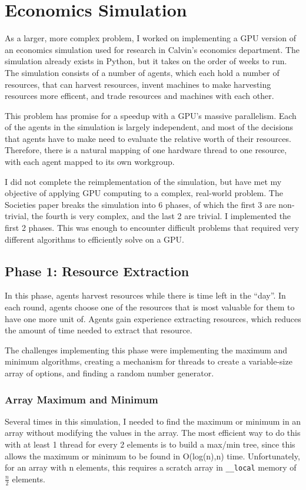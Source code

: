 \documentclass{article}
\begin{document}
\section{Economics Simulation}
As a larger, more complex problem, I worked on implementing a GPU version of an economics simulation used for research in Calvin's economics department.\cite{ditta13} The simulation already exists in Python, but it takes on the order of weeks to run. The simulation consists of a number of agents, which each hold a number of resources, that can harvest resources, invent machines to make harvesting resources more efficent, and trade resources and machines with each other.

This problem has promise for a speedup with a GPU's massive parallelism. Each of the agents in the simulation is largely independent, and most of the decisions that agents have to make need to evaluate the relative worth of their resources. Therefore, there is a natural mapping of one hardware thread to one resource, with each agent mapped to its own workgroup.

I did not complete the reimplementation of the simulation, but have met my objective of applying GPU computing to a complex, real-world problem. The Societies paper\cite{ditta13} breaks the simulation into 6 phases, of which the first 3 are non-trivial, the fourth is very complex, and the last 2 are trivial. I implemented the first 2 phases. This was enough to encounter difficult problems that required very different algorithms to efficiently solve on a GPU.

\subsection{Phase 1: Resource Extraction}
In this phase, agents harvest resources while there is time left in the ``day''. In each round, agents choose one of the resources that is most valuable for them to have one more unit of. Agents gain experience extracting resources, which reduces the amount of time needed to extract that resource.

The challenges implementing this phase were implementing the maximum and minimum algorithms, creating a mechanism for threads to create a variable-size array of options, and finding a random number generator.

\subsubsection{Array Maximum and Minimum}
Several times in this simulation, I needed to find the maximum or minimum in an array without modifying the values in the array. The most efficient way to do this with at least 1 thread for every 2 elements is to build a max/min tree, since this allows the maximum or minimum to be found in O(log(n),n) time. Unfortunately, for an array with n elements, this requires a scratch array in \texttt{\_\_local} memory of $\frac{n}{2}$ elements.
\end{document}
